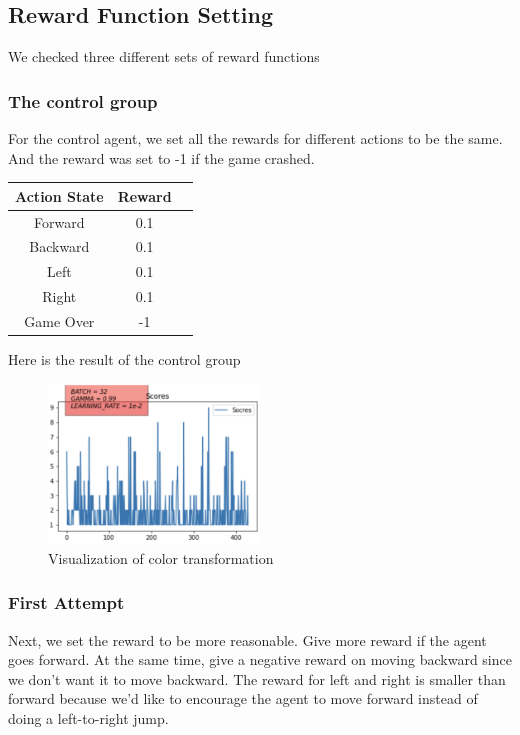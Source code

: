 \documentclass{article}
\begin{document}
\subsection{Reward Function Setting}
We checked three different sets of reward functions

\subsubsection{The control group}
For the control agent, we set all the rewards for different actions to be the same. And the reward was set to -1 if the game crashed.

\begin{center}
    \begin{tabular}{ | c | c| c | } 
    \hline
    Action State & Reward\\ 
    \hline
    Forward & 0.1\\ 
    \hline
    Backward & 0.1\\ 
    \hline
    Left & 0.1\\ 
    \hline
    Right & 0.1\\ 
    \hline
    Game Over & -1\\ 
    \hline
    \end{tabular}
\end{center}

Here is the result of the control group
\begin{figure}[h]
\caption{Visualization of color transformation}
\centering
\includegraphics[width=0.5\textwidth]{ControlAgent.png}
\end{figure}

\subsubsection{First Attempt}
Next, we set the reward to be more reasonable. Give more reward if the agent goes forward. At the same time, give a negative reward on moving backward since we don’t want it to move backward. The reward for left and right is smaller than forward because we’d like to encourage the agent to move forward instead of doing a left-to-right jump.
\end{document}

